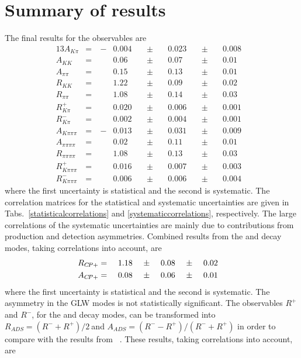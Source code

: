 \section{Summary of results}
\label{sec:cpfit:summary}

The final results for the \CP observables are  
\begin{alignat*}{13}
A_{K\pi} &= &\ -&0.004&\ &\pm&\ &0.023&\ &\pm&\ &0.008& \\
A_{KK} &= &&0.06&\ &\pm&\ &0.07&\ &\pm&\ &0.01& \\
A_{\pi\pi} &= &&0.15&\ &\pm&\ &0.13&\ &\pm&\ &0.01& \\
R_{KK} &= &&1.22&\ &\pm&\ &0.09&\ &\pm&\ &0.02& \\
R_{\pi\pi} &= &&1.08&\ &\pm&\ &0.14&\ &\pm&\ &0.03& \\
R^+_{K\pi} &= &&0.020&\ &\pm&\ &0.006&\ &\pm&\ &0.001& \\ 
R^-_{K\pi} &= &&0.002&\ &\pm&\ &0.004&\ &\pm&\ &0.001& \\
A_{K\pi\pi\pi} &= &\ -&0.013&\ &\pm&\ &0.031&\ &\pm&\ &0.009& \\
A_{\pi\pi\pi\pi} &= &&0.02&\ &\pm&\ &0.11&\ &\pm&\ &0.01& \\
R_{\pi\pi\pi\pi} &= &&1.08&\ &\pm&\ &0.13&\ &\pm&\ &0.03& \\
R^+_{K\pi\pi\pi} &= &&0.016&\ &\pm&\ &0.007&\ &\pm&\ &0.003& \\ 
R^-_{K\pi\pi\pi} &= &&0.006&\ &\pm&\ &0.006&\ &\pm&\ &0.004&
\end{alignat*}
where the first uncertainty is statistical and the second is systematic. The correlation matrices for the statistical and systematic uncertainties are given in Tabs.~\ref{statisticalcorrelations} and \ref{systematiccorrelations}, respectively. The large correlations of the systematic uncertainties are mainly due to contributions from production and detection asymmetries. Combined results from the \Kp\Km and \pip\pim decay modes, taking correlations into account, are
\begin{alignat*}{13}
R_{\CP+} &= &\ &1.18&\ &\pm&\ &0.08&\ &\pm&\ &0.02& \\
A_{\CP+} &= &\ &0.08&\ &\pm&\ &0.06&\ &\pm&\ &0.01&
\end{alignat*}
where the first uncertainty is statistical and the second is systematic. The asymmetry in the GLW modes is not statistically significant. The \CP observables $R^+$ and $R^-$, for the \pik and \pikpipi decay modes, can be transformed into $R_{ADS} = \left(R^- + R^+\right)/2\ $and \mbox{$A_{ADS} = \left(R^- - R^+\right)/\left(R^- + R^+\right)$} in order to compare with the results from \babar~\cite{BaBarDKstar}. These results, taking correlations into account, are
